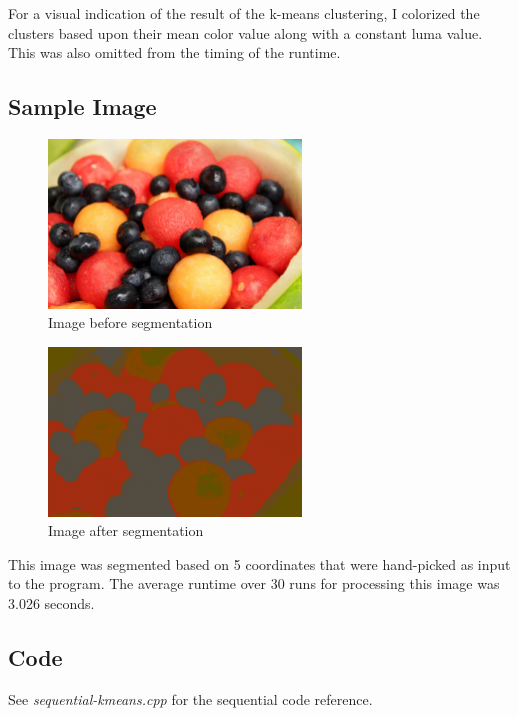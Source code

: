 \documentclass[11pt]{article}
\begin{document}
For a visual indication of the result of the k-means clustering, I colorized the clusters
based upon their mean color value along with a constant luma value. This was also omitted
from the timing of the runtime.

\subsection{Sample Image}

\begin{figure}
    \centering
    \includegraphics[width=0.6\textwidth]{fruit.png}
    \caption{Image\cite{fruit} before segmentation}
    \label{fig:fruit}
\end{figure}

\begin{figure}
    \centering
    \includegraphics[width=0.6\textwidth]{fruit-segmented.png}
    \caption{Image after segmentation}
    \label{fig:fruit-segmented}
\end{figure}

This image was segmented based on 5 coordinates that were hand-picked as input to the program.
The average runtime over 30 runs for processing this image was 3.026 seconds. 

\subsection{Code}

See \emph{sequential-kmeans.cpp} for the sequential code reference.
\end{document}
